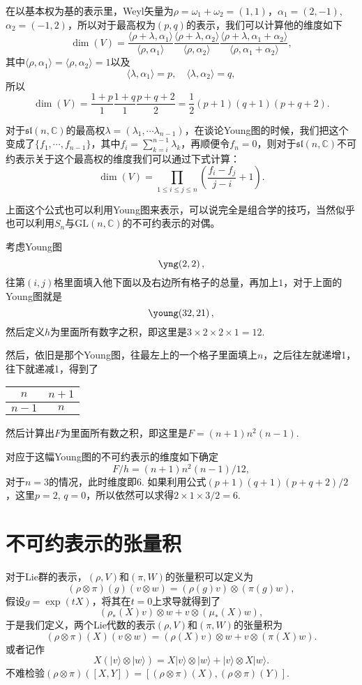 \documentclass[9pt]{extarticle}
\newcommand{\cc}{\mathbb{C}}
\begin{document}
在以基本权为基的表示里，Weyl矢量为$\rho=\omega_1+\omega_2=(1,1)$，$\alpha_1=(2,-1)$, $\alpha_2=(-1,2)$，所以对于最高权为$(p,q)$的表示，我们可以计算他的维度如下
\[
	\dim(V)=\frac{\langle \rho+\lambda,\alpha_1\rangle}{\langle \rho,\alpha_1\rangle}\frac{\langle \rho+\lambda,\alpha_2\rangle}{\langle \rho,\alpha_2\rangle}\frac{\langle \rho+\lambda,\alpha_1+\alpha_2\rangle}{\langle \rho,\alpha_1+\alpha_2\rangle},
\]
其中$\langle \rho,\alpha_1\rangle=\langle \rho,\alpha_2\rangle=1$以及
\[
\langle \lambda,\alpha_1\rangle=p,\quad \langle \lambda,\alpha_2\rangle=q,
\]
所以
\[
	\dim(V)=\frac{1+p}{1}\frac{1+q}{1}\frac{p+q+2}{2}=\frac{1}{2}(p+1)(q+1)(p+q+2).
\]

\para 对于$\mathfrak{sl}(n,\cc)$的最高权$\lambda=(\lambda_1,\cdots \lambda_{n-1})$，在谈论Young图的时候，我们把这个变成了$\{f_1,\cdots,f_{n-1}\}$，其中$f_i=\sum_{k=i}^{n-1}\lambda_k$，再顺便令$f_n=0$，则对于$\mathfrak{sl}(n,\cc)$不可约表示关于这个最高权的维度我们可以通过下式计算：
\[
	\dim(V)=\prod_{1\leq i\leq j\leq n}\left(\frac{f_i-f_j}{j-i}+1\right).
\]

上面这个公式也可以利用Young图来表示，可以说完全是组合学的技巧，当然似乎也可以利用$S_n$与$\mathrm{GL}(n,\cc)$的不可约表示的对偶。

考虑Young图
\[
	\yng(2,2)\,,
\]
往第$(i,j)$格里面填入他下面以及右边所有格子的总量，再加上$1$，对于上面的Young图就是
\[
	\young(32,21)\,,
\]
然后定义$h$为里面所有数字之积，即这里是$3\times 2\times 2\times 1=12$.

然后，依旧是那个Young图，往最左上的一个格子里面填上$n$，之后往左就递增1，往下就递减1，得到了
\begin{center}
  \begin{tabular}{ | c | c |}
    \hline
    $n$ & $n+1$  \\ \hline
    $n-1$ & $n$\\
    \hline
  \end{tabular}
\end{center}
然后计算出$F$为里面所有数之积，即这里是$F=(n+1)n^2(n-1)$.

对应于这幅Young图的不可约表示的维度如下确定
\[
	F/h=(n+1)n^2(n-1)/12,
\]
对于$n=3$的情况，此时维度即$6$. 如果利用公式$(p+1)(q+1)(p+q+2)/2$，这里$p=2$, $q=0$，所以依然可以求得$2\times 1\times 3/2=6$.

\section{不可约表示的张量积}

对于Lie群的表示，$(\rho,V)$和$(\pi,W)$的张量积可以定义为
\[
	(\rho\otimes\pi)(g)(v\otimes w)=(\rho(g)v)\otimes(\pi(g)w),
\]
假设$g=\exp(tX)$，将其在$t=0$上求导就得到了
\[
	(\rho_*(X)v)\otimes w+ v \otimes (\mu_*(X)w),
\]
于是我们定义，两个Lie代数的表示$(\rho,V)$和$(\pi,W)$的张量积为
\[
	(\rho\otimes\pi)(X)(v\otimes w)=(\rho(X)v)\otimes w+ v \otimes (\pi(X)w).
\]
或者记作
\[
	X(|v\rangle\otimes|w\rangle)=X|v\rangle\otimes|w\rangle+|v\rangle\otimes X|w\rangle.
\]
不难检验$(\rho\otimes\pi)([X,Y])=[(\rho\otimes\pi)(X),(\rho\otimes\pi)(Y)]$.
\end{document}
